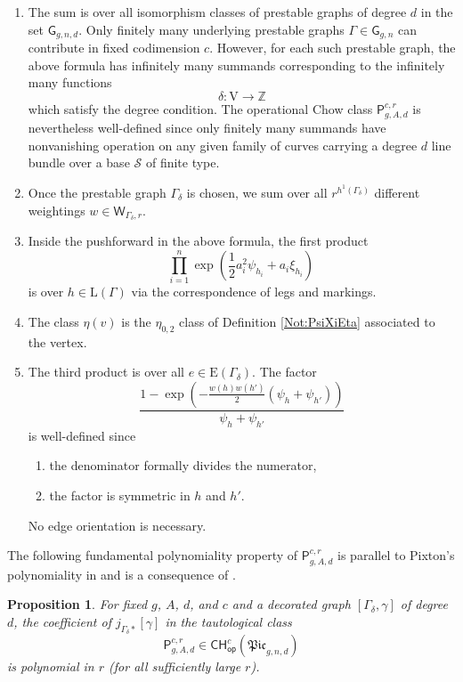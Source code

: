 \documentclass[a4paper,12pt]{article} %
\def\P{\mathsf{P}}
\def\E{\mathrm{E}}
\def\L{\mathrm{L}}
\def\V{\mathrm{V}}
\theoremstyle{definition}
\theoremstyle{plain}%
\newtheorem{proposition}[definition]{Proposition}
\newcommand{\Picabs}{\mathfrak{Pic}}
\begin{document}
\begin{enumerate}
    \item[(i)]
    The sum is over all isomorphism classes of prestable graphs of degree $d$ in the
    set $\mathsf{G}_{g,n,d}$. 
    Only finitely many underlying prestable graphs $\Gamma\in \mathsf{G}_{g,n}$ can
    contribute in fixed codimension $c$. However, for each such prestable graph, the above formula
    has infinitely many summands corresponding to the infinitely many functions
    $$\delta: \V \rightarrow \mathbb{Z}$$
    which satisfy the degree condition.
    The operational Chow class $\P_{g,A,d}^{c,r}$ is nevertheless well-defined since
      only finitely many summands have nonvanishing operation on any given family of curves
       carrying a degree $d$ line bundle over a base $\mathcal{S}$ of finite type.
    \item[(ii)] 
    Once the prestable graph $\Gamma_\delta$ is chosen, we sum over all $r^{h^1(\Gamma_\delta)}$ different 
    weightings $w\in \mathsf{W}_{\Gamma_\delta,r}$.
    \item[(iii)]
Inside the pushforward in the above formula, the first product 
$$\prod_{i=1}^n \exp\left(\frac{1}{2}a_i^2 \psi_{h_i}+a_i \xi_{h_i}\right)\, $$
is over $h\in \L(\Gamma)$
via the correspondence of legs and markings.
\item[(iv)]The class $\eta(v)$ is the $\eta_{0,2}$ class 
of Definition \ref{Not:PsiXiEta} associated to the vertex.
\item[(v)]
The third product is over all $e\in \E(\Gamma_\delta)$.
The factor 
$$\frac{1-\exp\left(-\frac{w(h)w(h')}{2}(\psi_h+\psi_{h'})\right)}{\psi_h + \psi_{h'}}$$
is well-defined since 
\begin{enumerate}
\item[$\bullet$]
the denominator formally divides
the numerator,
\item[$\bullet$] the factor is symmetric in $h$ and $h'$.
\end{enumerate}
No edge orientation is necessary.
\end{enumerate}

The following fundamental polynomiality property of $\P_{g,A,d}^{c,r}$ 
 is
parallel to Pixton's polynomiality in \cite[Appendix]{Janda2016Double-ramifica} and
is a consequence of \cite[Proposition $3''$]{Janda2016Double-ramifica}.

\begin{proposition} \label{pply} For fixed $g$, $A$, $d$, and $c$ and a decorated graph $[\Gamma_\delta, \gamma]$ of
degree $d$, the coefficient of $j_{\Gamma_\delta*} [\gamma]$ in the
tautological class
$$\P_{g,A,d}^{c,r} \in \mathsf{CH}^c_{\mathsf{op}}(\Picabs_{g,n,d})$$
is polynomial in $r$ (for all sufficiently large $r$).
\end{proposition}
\end{document}
